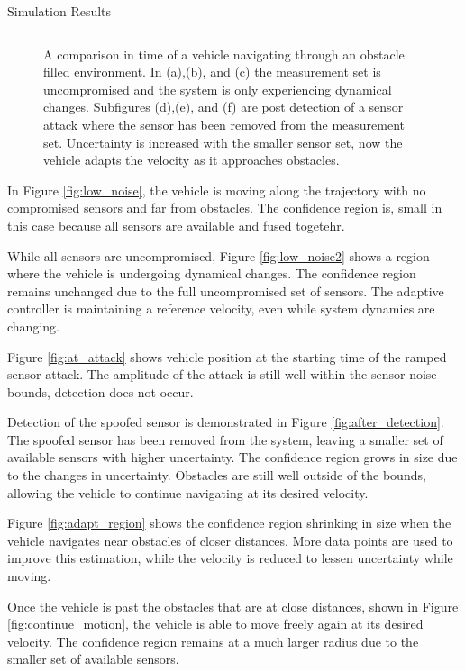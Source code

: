 \begin{section}{Simulation Results}
\begin{figure}[b!th]
\begin{tabular}{ccc}
\end{tabular}
\caption{A comparison in time of a vehicle navigating through an obstacle filled environment. In (a),(b), and (c) the measurement set is uncompromised and the system is only experiencing dynamical changes. Subfigures (d),(e), and (f) are post detection of a sensor attack where the sensor has been removed from the measurement set. Uncertainty is increased with the smaller sensor set, now the vehicle adapts the velocity as it approaches obstacles.}

\end{figure}

In Figure \ref{fig:low_noise}, the vehicle is moving along the trajectory with no compromised sensors and far from obstacles. The confidence region is, small in this case because all sensors are available and fused togetehr. 

While all sensors are uncompromised, Figure \ref{fig:low_noise2} shows a region where the vehicle is undergoing dynamical changes. The confidence region remains unchanged due to the full uncompromised set of sensors. The adaptive controller is maintaining a reference velocity, even while system dynamics are changing.

Figure \ref{fig:at_attack} shows vehicle position at the starting time of the ramped sensor attack. The amplitude of the attack is still well within the sensor noise bounds, detection does not occur.


Detection of the spoofed sensor is demonstrated in Figure \ref{fig:after_detection}. The spoofed sensor has been removed from the system, leaving a smaller set of available sensors with higher uncertainty. The confidence region grows in size due to the changes in uncertainty. Obstacles are still well outside of the bounds, allowing the vehicle to continue navigating at its desired velocity.

Figure \ref{fig:adapt_region} shows the confidence region shrinking in size when the vehicle navigates near obstacles of closer distances. More data points are used to improve this estimation, while the velocity is reduced to lessen uncertainty while moving.

Once the vehicle is past the obstacles that are at close distances, shown in Figure \ref{fig:continue_motion}, the vehicle is able to move freely again at its desired velocity. The confidence region remains at a much larger radius due to the smaller set of available sensors.


\end{section}
